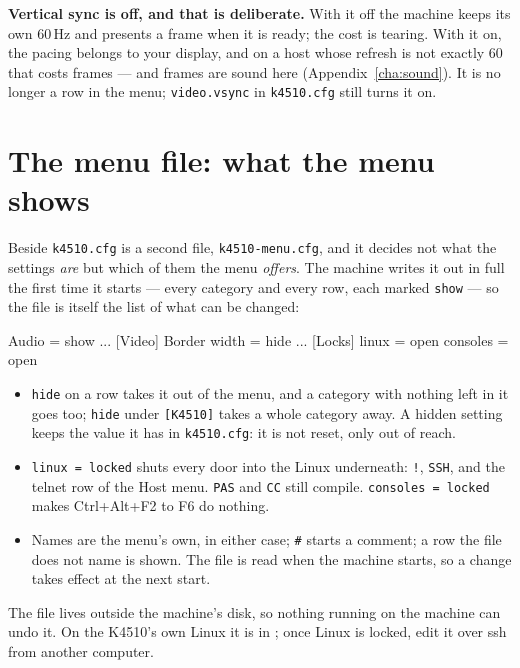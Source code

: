 \begin{aside}
\textbf{Vertical sync is off, and that is deliberate.} With it off the
machine keeps its own 60\,Hz and presents a frame when it is ready; the
cost is tearing. With it on, the pacing belongs to your display, and on
a host whose refresh is not exactly 60 that costs frames --- and frames
are sound here (Appendix~\ref{cha:sound}). It is no longer a row in the
menu; \texttt{video.vsync} in \texttt{k4510.cfg} still turns it on.
\end{aside}

\section{The menu file: what the menu shows}\label{sec:menufile}
Beside \texttt{k4510.cfg} is a second file, \texttt{k4510-menu.cfg}, and
it decides not what the settings \emph{are} but which of them the menu
\emph{offers}. The machine writes it out in full the first time it
starts --- every category and every row, each marked \verb|show| --- so
the file is itself the list of what can be changed:

\begin{form}
[K4510]
Audio                    = show
...
[Video]
Border width             = hide
...
[Locks]
linux    = open
consoles = open
\end{form}

\begin{itemize}[leftmargin=1.4em]
\item \verb|hide| on a row takes it out of the menu, and a category with
  nothing left in it goes too; \verb|hide| under \verb|[K4510]| takes a
  whole category away. A hidden setting keeps the value it has in
  \texttt{k4510.cfg}: it is not reset, only out of reach.
\item \verb|linux = locked| shuts every door into the Linux
  underneath: \verb|!|, \verb|SSH|, and the telnet row of the Host
  menu. \verb|PAS|
  and \verb|CC| still compile. \verb|consoles = locked| makes
  Ctrl+Alt+F2 to F6 do nothing.
\item Names are the menu's own, in either case; \verb|#| starts a
  comment; a row the file does not name is shown. The file is read when
  the machine starts, so a change takes effect at the next start.
\end{itemize}

\noindent The file lives outside the machine's disk, so nothing running
on the machine can undo it. On the K4510's own Linux it is in
; once Linux is locked, edit it over ssh from
another computer.

